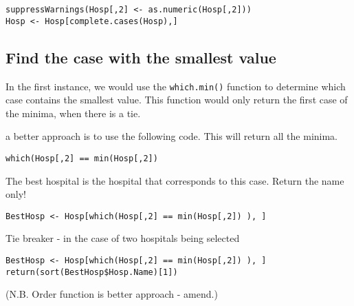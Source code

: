 \documentclass[]{article}
\begin{document}
\begin{verbatim}
suppressWarnings(Hosp[,2] <- as.numeric(Hosp[,2]))
Hosp <- Hosp[complete.cases(Hosp),]
\end{verbatim}

\subsection{Find the case with the smallest value}

In the first instance, we would use the \texttt{which.min()} function to determine which case contains the smallest value.
This function would only return the first case of the minima, when there is a tie.

a better approach is to use the following code. This will return all the minima.
\begin{framed}
\begin{verbatim}
which(Hosp[,2] == min(Hosp[,2])
\end{verbatim}
\end{framed}

The best hospital is the hospital that corresponds to this case. Return the name only!

\begin{verbatim}
BestHosp <- Hosp[which(Hosp[,2] == min(Hosp[,2]) ), ]
\end{verbatim}

Tie breaker - in the case of two hospitals being selected

\begin{verbatim}
BestHosp <- Hosp[which(Hosp[,2] == min(Hosp[,2]) ), ]
return(sort(BestHosp$Hosp.Name)[1])
\end{verbatim}

(N.B. Order function is better approach - amend.)
\end{document}
